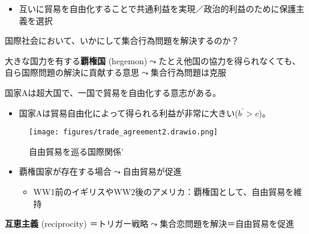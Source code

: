\documentclass[
  xelatex,
  ja=standard]{bxjsarticle}
\providecommand{\tightlist}{%
  \setlength{\itemsep}{0pt}\setlength{\parskip}{0pt}}\usepackage{longtable,booktabs,array}
\begin{document}
\begin{itemize}
\tightlist
\item
  互いに貿易を自由化することで共通利益を実現／政治的利益のために保護主義を選択
\end{itemize}

国際社会において、いかにして集合行為問題を解決するのか？

大きな国力を有する\textbf{覇権国}
(hegemon)\(\leadsto\)たとえ他国の協力を得られなくても、自ら国際問題の解決に貢献する意思\(\leadsto\)集合行為問題は克服\citep{lake1993}

\begin{tcolorbox}[enhanced jigsaw, coltitle=black, breakable, opacitybacktitle=0.6, left=2mm, titlerule=0mm, arc=.35mm, colbacktitle=quarto-callout-tip-color!10!white, opacityback=0, leftrule=.75mm, title=\textcolor{quarto-callout-tip-color}{\faLightbulb}\hspace{0.5em}{自由貿易を巡る国際関係'}, toptitle=1mm, bottomrule=.15mm, colframe=quarto-callout-tip-color-frame, toprule=.15mm, colback=white, rightrule=.15mm, bottomtitle=1mm]

国家Aは超大国で、一国で貿易を自由化する意志がある。

\begin{itemize}
\tightlist
\item
  国家Aは貿易自由化によって得られる利益が非常に大きい(\(b^\prime > c\))。
\end{itemize}

\end{tcolorbox}

\begin{figure}[htpb]

{\centering \texttt{[image: figures/trade\_agreement2.drawio.png]}

}

\caption{自由貿易を巡る国際関係'}

\end{figure}

\begin{itemize}
\tightlist
\item
  覇権国家が存在する場合\(\leadsto\)自由貿易が促進

  \begin{itemize}
  \tightlist
  \item
    WW1前のイギリスやWW2後のアメリカ：覇権国として、自由貿易を維持
  \end{itemize}
\end{itemize}

\textbf{互恵主義} (reciprocity)
＝トリガー戦略\(\leadsto\)集合恋問題を解決＝自由貿易を促進
\end{document}
